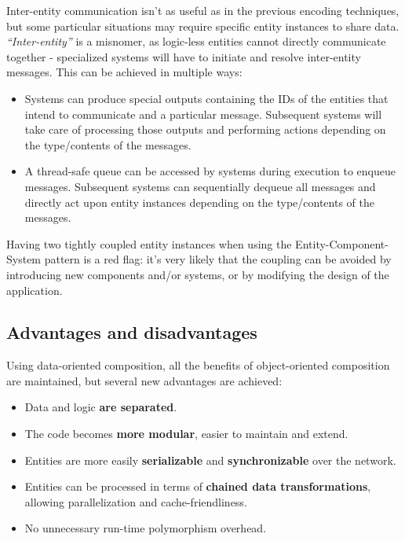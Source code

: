 \documentclass[twoside, 12pt, a4paper, openany]{book}
\begin{document}
Inter-entity communication isn't as useful as in the previous encoding
techniques, but some particular situations may require specific entity
instances to share data. \emph{``Inter-entity''} is a misnomer, as
logic-less entities cannot directly communicate together - specialized
systems will have to initiate and resolve inter-entity messages. This
can be achieved in multiple ways:

\begin{itemize}
\item
  Systems can produce special outputs containing the IDs of the entities
  that intend to communicate and a particular message. Subsequent
  systems will take care of processing those outputs and performing
  actions depending on the type/contents of the messages.
\item
  A thread-safe queue can be accessed by systems during execution to
  enqueue messages. Subsequent systems can sequentially dequeue all
  messages and directly act upon entity instances depending on the
  type/contents of the messages.
\end{itemize}

Having two tightly coupled entity instances when using the
Entity-Component-System pattern is a red flag: it's very likely that the
coupling can be avoided by introducing new components and/or systems, or
by modifying the design of the application.

\subsection{Advantages and
disadvantages}\label{advantages-and-disadvantages-2}

Using data-oriented composition, all the benefits of object-oriented
composition are maintained, but several new advantages are achieved:

\begin{itemize}
\item
  Data and logic \textbf{are separated}.
\item
  The code becomes \textbf{more modular}, easier to maintain and extend.
\item
  Entities are more easily \textbf{serializable} and
  \textbf{synchronizable} over the network.
\item
  Entities can be processed in terms of \textbf{chained data
  transformations}, allowing parallelization and cache-friendliness.
\item
  No unnecessary run-time polymorphism overhead.
\end{itemize}
\end{document}
